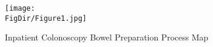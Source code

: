\hypertarget{Inpatient Colonoscopy Bowel Preparation Process Map}{}
\begin{figure}
    \centerline{\texttt{[image: \\FigDir/Figure1.jpg]}}
    \caption{Inpatient Colonoscopy Bowel Preparation Process Map}
    \label{fig:process}
\end{figure}